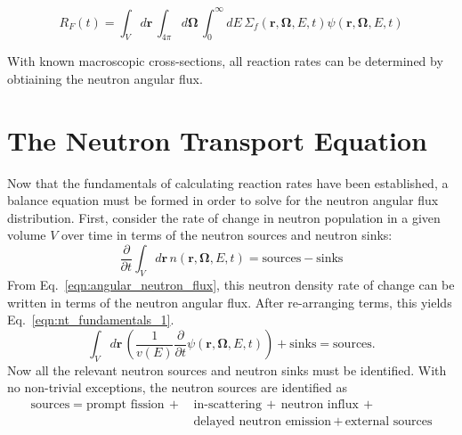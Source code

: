 \begin{equation}
R_{F}(t) = \int_{V} d\mathbf{r} \,  \int_{4\pi} d\mathbf{\Omega} \, \int_{0}^{\infty} dE \, \Sigma_f(\mathbf{r}, \mathbf{\Omega}, E, t) \psi(\mathbf{r}, \mathbf{\Omega}, E, t)
\label{eqn:rr_psi}
\end{equation}

With known macroscopic cross-sections, all reaction rates can be determined by obtiaining the neutron angular flux.

\section{The Neutron Transport Equation}
\label{sec:transport-eq}

Now that the fundamentals of calculating reaction rates have been established, a balance equation must be formed in order to solve for the neutron angular flux distribution. First, consider the rate of change in neutron population in a given volume $V$ over time in terms of the neutron sources and neutron sinks:
\begin{equation}
\frac{\partial}{\partial t} \int_V d\mathbf{r} \, n(\mathbf{r},\mathbf{\Omega},E,t) = \text{sources} - \text{sinks}
\end{equation}
From Eq.~\ref{eqn:angular_neutron_flux}, this neutron density rate of change can be written in terms of the neutron angular flux. After re-arranging terms, this yields Eq.~\ref{eqn:nt_fundamentals_1}.
\begin{equation}
\int_V d\mathbf{r} \, \left( \frac{1}{v(E)} \frac{\partial}{\partial t} \psi(\mathbf{r},\mathbf{\Omega},E,t)\right) + \text{sinks} = \text{sources}.
\label{eqn:nt_fundamentals_1}
\end{equation}
Now all the relevant neutron sources and neutron sinks must be identified. With no non-trivial exceptions, the neutron sources are identified as
\begin{equation}
\begin{split}
\text{sources} = \text{prompt fission} \, + \, & \text{in-scattering} \, +  \, \text{neutron influx} \, + \\ & \text{delayed neutron emission} \, + \, \text{external sources} \\
\end{split}
\end{equation}
